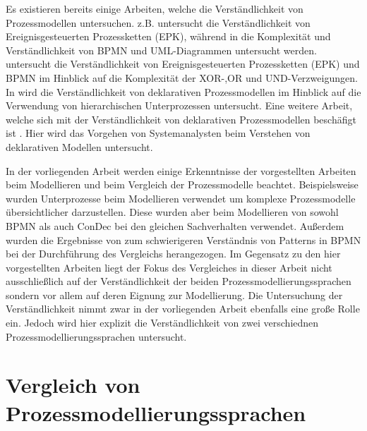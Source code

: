 Es existieren bereits einige Arbeiten, welche die Verständlichkeit von Prozessmodellen untersuchen. \cite{bpm07} z.B. untersucht die Verständlichkeit von Ereignisgesteuerten Prozessketten (EPK), während in \cite{gruhn2006complexity} die Komplexität und Verständlichkeit von BPMN und UML-Diagrammen untersucht werden. \cite{reijers2011study} untersucht die Verständlichkeit von Ereignisgesteuerten Prozessketten (EPK) und BPMN im Hinblick auf die Komplexität der XOR-,OR und UND-Verzweigungen. \newline
In \cite{sabrina942} wird die Verständlichkeit von deklarativen Prozessmodellen im Hinblick auf die Verwendung von hierarchischen Unterprozessen untersucht. Eine weitere Arbeit, welche sich mit der Verständlichkeit von deklarativen Prozessmodellen beschäfigt ist \cite{haisjackl2014understanding}. Hier wird das Vorgehen von Systemanalysten beim Verstehen von deklarativen Modellen untersucht.\newline

In der vorliegenden Arbeit werden einige Erkenntnisse der vorgestellten Arbeiten beim Modellieren und beim Vergleich der Prozessmodelle beachtet. Beispielsweise wurden Unterprozesse beim  Modellieren verwendet um komplexe Prozessmodelle übersichtlicher darzustellen. Diese wurden  aber beim Modellieren von sowohl BPMN als auch ConDec bei den gleichen Sachverhalten verwendet.\newline
Außerdem wurden die Ergebnisse von \cite{ haisjackl2014understanding} zum schwierigeren Verständnis von Patterns in BPMN bei der Durchführung des Vergleichs herangezogen.\newline
Im Gegensatz zu den hier vorgestellten Arbeiten liegt der Fokus des Vergleiches in dieser Arbeit nicht ausschließlich auf der Verständlichkeit der beiden Prozessmodellierungssprachen sondern vor allem auf deren Eignung zur Modellierung. Die Untersuchung der Verständlichkeit nimmt zwar in der vorliegenden Arbeit ebenfalls eine große Rolle ein. Jedoch wird hier explizit die Verständlichkeit von zwei verschiednen Prozessmodellierungssprachen untersucht.\newline


\section{Vergleich von Prozessmodellierungssprachen}

